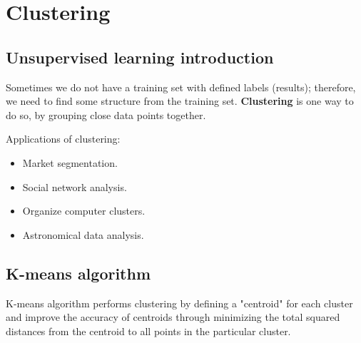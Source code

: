\section{Clustering}
\subsection{Unsupervised learning introduction}
    Sometimes we do not have a training set with defined labels (results); therefore, we need to find some structure from the training set.
    \textbf{Clustering} is one way to do so, by grouping close data points together.


    Applications of clustering:
    \begin{itemize}
        \item Market segmentation.
        \item Social network analysis.
        \item Organize computer clusters.
        \item Astronomical data analysis.
    \end{itemize}

\subsection{K-means algorithm}
    K-means algorithm performs clustering by defining a "centroid" for each cluster and improve the accuracy of centroids through minimizing the total squared distances from the centroid to all points in the particular cluster.

